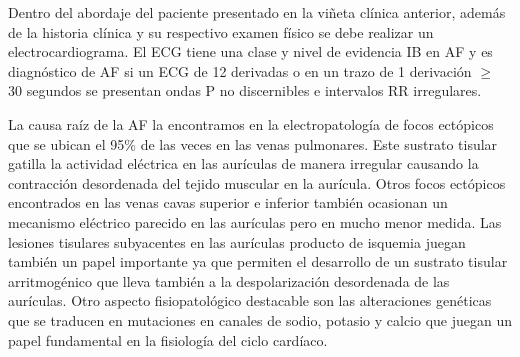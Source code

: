 \documentclass[a4paper]{article}
\let\cite=\supercite
\begin{document}
\begin{multicols}{3}
\begin{boxClinica}
\end{boxClinica}

Dentro del abordaje del paciente presentado en la viñeta clínica anterior,
además de la historia clínica y su respectivo examen físico se debe realizar un
electrocardiograma. El ECG tiene una clase y nivel de evidencia IB en AF y es
diagnóstico de AF si un ECG de 12 derivadas o en un trazo de 1 derivación
$\geq$ 30 segundos se presentan ondas P no discernibles e intervalos RR
irregulares\cite{guiaesc_2021}.

La causa raíz de la AF la encontramos en la electropatología de focos ectópicos
que se ubican el 95\% de las veces en las venas pulmonares. Este sustrato
tisular gatilla la actividad eléctrica en las aurículas de manera irregular
causando la contracción desordenada del tejido muscular en la aurícula. Otros
focos ectópicos encontrados en las venas cavas superior e inferior también
ocasionan un mecanismo eléctrico parecido en las aurículas pero en mucho menor
medida. Las lesiones tisulares subyacentes en las aurículas producto de
isquemia juegan también un papel importante ya que permiten el desarrollo de un
sustrato tisular arritmogénico que lleva también a la despolarización
desordenada de las aurículas. Otro aspecto fisiopatológico destacable son las
alteraciones genéticas que se traducen en mutaciones en canales de sodio,
potasio y calcio que juegan un papel fundamental en la fisiología del ciclo
cardíaco\cite{brundel_atrial_2022}.

\closearticle

\printbibliography[heading=none]

\closearticle

\end{multicols}
\end{document}
